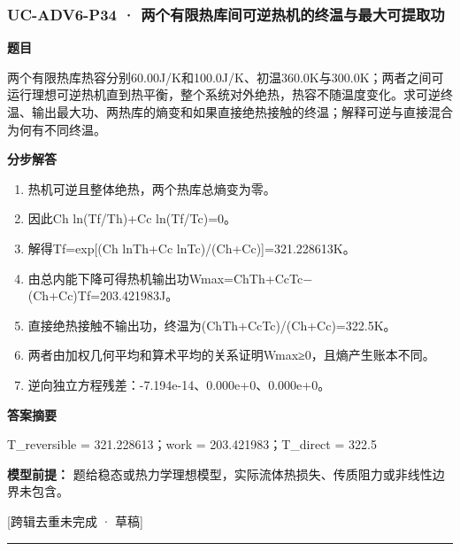 \documentclass[UTF8,11pt,a4paper]{ctexart}
\begin{document}
\subsubsection*{UC-ADV6-P34 · 两个有限热库间可逆热机的终温与最大可提取功}
\noindent\textbf{题目}\par
两个有限热库热容分别60.00J/K和100.0J/K、初温360.0K与300.0K；两者之间可运行理想可逆热机直到热平衡，整个系统对外绝热，热容不随温度变化。求可逆终温、输出最大功、两热库的熵变和如果直接绝热接触的终温；解释可逆与直接混合为何有不同终温。\par
\medskip\noindent\textbf{分步解答}
\begin{enumerate}
\item 热机可逆且整体绝热，两个热库总熵变为零。
\item 因此Ch ln(Tf/Th)+Cc ln(Tf/Tc)=0。
\item 解得Tf=exp[(Ch lnTh+Cc lnTc)/(Ch+Cc)]=321.228613K。
\item 由总内能下降可得热机输出功Wmax=ChTh+CcTc−(Ch+Cc)Tf=203.421983J。
\item 直接绝热接触不输出功，终温为(ChTh+CcTc)/(Ch+Cc)=322.5K。
\item 两者由加权几何平均和算术平均的关系证明Wmax≥0，且熵产生账本不同。
\item 逆向独立方程残差：-7.194e-14、0.000e+0、0.000e+0。
\end{enumerate}
\noindent\textbf{答案摘要}\par
T\_reversible = 321.228613；work = 203.421983；T\_direct = 322.5\par
\noindent\textbf{模型前提：}
题给稳态或热力学理想模型，实际流体热损失、传质阻力或非线性边界未包含。\par
\noindent\textcolor{red!65!black}{[跨辑去重未完成 · 草稿]} \par
\medskip\hrule\medskip
{}
\end{document}
